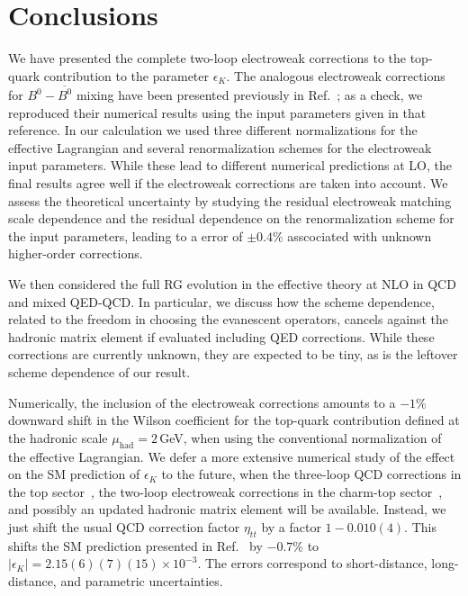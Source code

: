 \documentclass[letter,11pt,DIV=12,abstract=true,numbers=noenddot,titlepage=false,twocolumn=false,draft=false]{scrartcl}
\begin{document}
\section{Conclusions}\label{sec:conclusions}

We have presented the complete two-loop electroweak corrections to the
top-quark contribution to the parameter $\epsilon_K$. The analogous
electroweak corrections for $B^0 - \overline{B^0}$ mixing have been
presented previously in Ref.~\cite{Gambino:1998rt}; as a check, we
reproduced their numerical results using the input parameters given in
that reference. In our calculation we used three different
normalizations for the effective Lagrangian and several
renormalization schemes for the electroweak input parameters. While
these lead to different numerical predictions at LO, the final results
agree well if the electroweak corrections are taken into account. We
assess the theoretical uncertainty by studying the residual
electroweak matching scale dependence and the residual dependence on
the renormalization scheme for the input parameters, leading to a
error of $\pm 0.4\%$ asscociated with unknown higher-order
corrections.

We then considered the full RG evolution in the effective theory at
NLO in QCD and mixed QED-QCD. In particular, we discuss how the scheme
dependence, related to the freedom in choosing the evanescent
operators, cancels against the hadronic matrix element if evaluated
including QED corrections. While these corrections are currently
unknown, they are expected to be tiny, as is the leftover scheme
dependence of our result.

Numerically, the inclusion of the electroweak corrections amounts to a
$-1\%$ downward shift in the Wilson coefficient for the top-quark
contribution defined at the hadronic scale $\mu_\text{had} = 2\,$GeV,
when using the conventional normalization of the effective
Lagrangian. We defer a more extensive numerical study of the effect on
the SM prediction of $\epsilon_K$ to the future, when the three-loop
QCD corrections in the top sector~\cite{BGSY}, the two-loop
electroweak corrections in the charm-top sector~\cite{BKPY}, and
possibly an updated hadronic matrix element will be
available. Instead, we just shift the usual QCD correction factor
$\eta_{tt}$ by a factor $1-0.010(4)$. This shifts the SM prediction
presented in Ref.~\cite{Brod:2019rzc} by $-0.7\%$ to $|\epsilon_K| =
2.15(6)(7)(15) \times 10^{-3}$. The errors correspond to
short-distance, long-distance, and parametric uncertainties.
\end{document}

